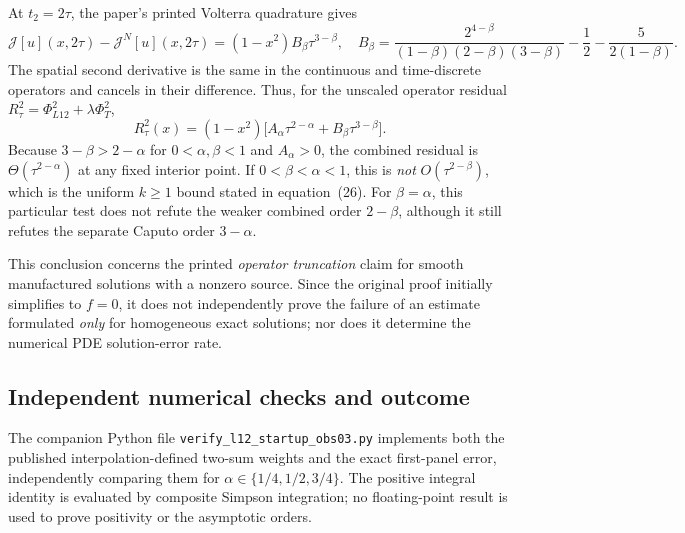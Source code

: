\documentclass[11pt,a4paper]{amsart}
\theoremstyle{remark}
\theoremstyle{plain}
\theoremstyle{remark}
\numberwithin{equation}{section}
\begin{document}
At $t_2=2\tau$, the paper's printed Volterra quadrature gives
\begin{equation}\label{eq:ob03-volterra-n2}
 \mathcal J[u](x,2\tau)-\mathcal J^N[u](x,2\tau)
 =(1-x^2)B_\beta\tau^{3-\beta},\quad
 B_\beta=\frac{2^{4-\beta}}{(1-\beta)(2-\beta)(3-\beta)}
 -\frac12-\frac{5}{2(1-\beta)}.
\end{equation}
The spatial second derivative is the same in the continuous and time-discrete operators and cancels in their difference. Thus, for the unscaled operator residual $R_\tau^2=\Phi_{L12}^2+\lambda\Phi_T^2$,
\begin{equation}\label{eq:ob03-total-residual}
 R_\tau^2(x)=(1-x^2)\bigl[A_\alpha\tau^{2-\alpha}
 +B_\beta\tau^{3-\beta}\bigr].
\end{equation}
Because $3-\beta>2-\alpha$ for $0<\alpha,\beta<1$ and $A_\alpha>0$, the combined residual is $\Theta(\tau^{2-\alpha})$ at any fixed interior point. If $0<\beta<\alpha<1$, this is \emph{not} $O(\tau^{2-\beta})$, which is the uniform $k\ge1$ bound stated in equation~(26). For $\beta=\alpha$, this particular test does not refute the weaker combined order $2-\beta$, although it still refutes the separate Caputo order $3-\alpha$.

This conclusion concerns the printed \emph{operator truncation} claim for smooth manufactured solutions with a nonzero source. Since the original proof initially simplifies to $f=0$, it does not independently prove the failure of an estimate formulated \emph{only} for homogeneous exact solutions; nor does it determine the numerical PDE solution-error rate.

\subsection{Independent numerical checks and outcome}
The companion Python file \texttt{verify\_l12\_startup\_obs03.py} implements both the published interpolation-defined two-sum weights and the exact first-panel error, independently comparing them for $\alpha\in\{1/4,1/2,3/4\}$. The positive integral identity is evaluated by composite Simpson integration; no floating-point result is used to prove positivity or the asymptotic orders.
\end{document}
